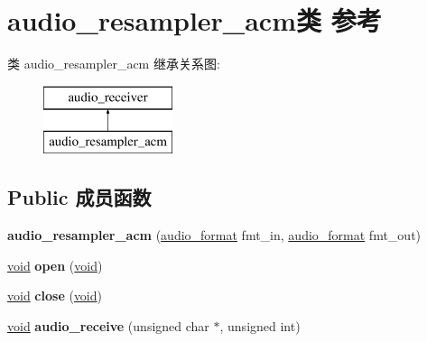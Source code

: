 \hypertarget{classaudio__resampler__acm}{}\section{audio\+\_\+resampler\+\_\+acm类 参考}
\label{classaudio__resampler__acm}
类 audio\+\_\+resampler\+\_\+acm 继承关系图\+:\begin{figure}[H]
\begin{center}
\leavevmode
\includegraphics[height=2.000000cm]{classaudio__resampler__acm}
\end{center}
\end{figure}
\subsection*{Public 成员函数}
\begin{DoxyCompactItemize}
\item 
\mbox{\label{classaudio__resampler__acm_a84f424c66a431d33045d978e5559db2d}} 
{\bfseries audio\+\_\+resampler\+\_\+acm} (\hyperlink{classaudio__format}{audio\+\_\+format} fmt\+\_\+in, \hyperlink{classaudio__format}{audio\+\_\+format} fmt\+\_\+out)
\item 
\mbox{\label{classaudio__resampler__acm_a4390652cc10500f7b7412bff7fa05504}} 
\hyperlink{interfacevoid}{void} {\bfseries open} (\hyperlink{interfacevoid}{void})
\item 
\mbox{\label{classaudio__resampler__acm_a7130f589f30c537d79311c44b1a8f6fe}} 
\hyperlink{interfacevoid}{void} {\bfseries close} (\hyperlink{interfacevoid}{void})
\item 
\mbox{\label{classaudio__resampler__acm_ad622f2d722407eb6b15c8fbb2cdbb47b}} 
\hyperlink{interfacevoid}{void} {\bfseries audio\+\_\+receive} (unsigned char $\ast$, unsigned int)
\end{DoxyCompactItemize}
